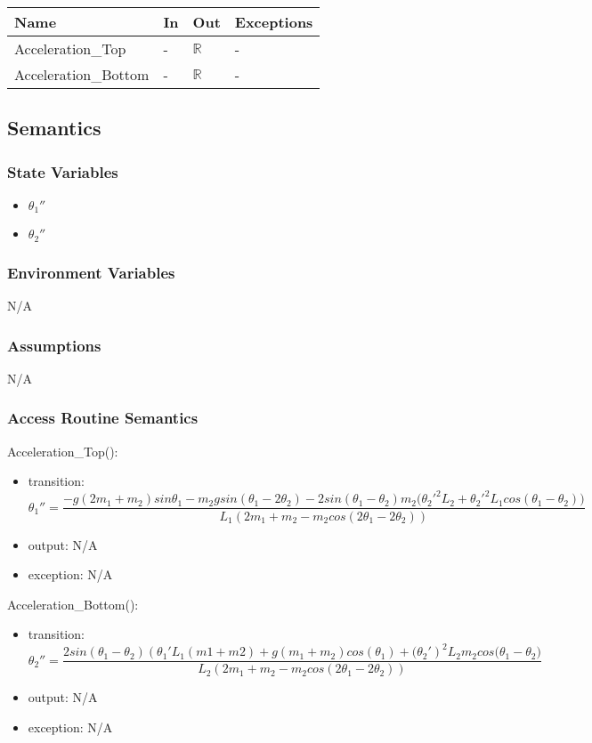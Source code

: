 \documentclass[12pt, titlepage]{article}
\begin{document}
\begin{center}
\begin{tabular}{p{4cm} p{2cm} p{2cm} p{4cm}}
\hline
\textbf{Name} & \textbf{In} & \textbf{Out} & \textbf{Exceptions} \\
\hline
Acceleration\_Top & - & $\mathbb{R}$ & - \\
\hline
Acceleration\_Bottom & - & $\mathbb{R}$ & - \\
\hline
\end{tabular}
\end{center}

\subsection{Semantics}

\subsubsection{State Variables}
\begin{itemize}
\item ${\theta_1}''$
\item ${\theta_2}''$
\end{itemize}

\subsubsection{Environment Variables}
N/A
\subsubsection{Assumptions}
N/A
\subsubsection{Access Routine Semantics}

\noindent Acceleration\_Top():
\begin{itemize}
\item transition: \[{\theta_1}''=\frac{-g(2m_1+m_2)sin\theta_1-m_2gsin(\theta_1-2\theta_2)-2sin(\theta_1-\theta_2)m_2({{\theta_2}'}^2L_2+{{\theta_2}'}^2L_1cos(\theta_1-\theta_2)\big)}{L_1(2m_1+m_2-m_2cos(2\theta_1-2\theta_2))}\] 
\item output: N/A
\item exception: N/A
\end{itemize}

\noindent Acceleration\_Bottom():
\begin{itemize}
\item transition: \[{\theta_2}''=\frac{2sin(\theta_1-\theta_2)({\theta_1}'L_1(m1+m2)+g(m_1+m_2)cos(\theta_1)+{(\theta_2}')^2L_2m_2cos(\theta_1-\theta_2\big)}{L_2(2m_1+m_2-m_2cos(2\theta_1-2\theta_2))}\] 
\item output: N/A
\item exception: N/A
\end{itemize}
\end{document}
